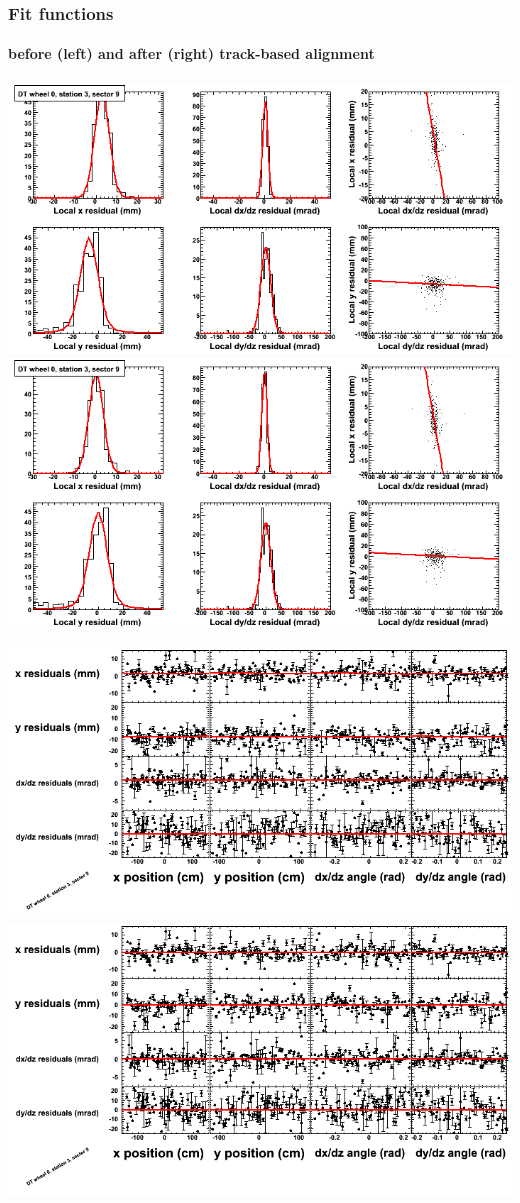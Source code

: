 \documentclass[compress]{beamer}
\begin{document}
\begin{frame}
\frametitle{Fit functions}
\framesubtitle{before (left) and after (right) track-based alignment}
\includegraphics[width=0.5\linewidth]{fitfunctions_re01/MBwhCst3sec09_bellcurves.png} \includegraphics[width=0.5\linewidth]{fitfunctions_re05/MBwhCst3sec09_bellcurves.png}

\includegraphics[width=0.5\linewidth]{fitfunctions_re01/MBwhCst3sec09_polynomials.png} \includegraphics[width=0.5\linewidth]{fitfunctions_re05/MBwhCst3sec09_polynomials.png}
\end{frame}
\end{document}
